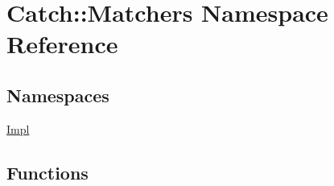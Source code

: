 \hypertarget{namespace_catch_1_1_matchers}{}\section{Catch\+:\+:Matchers Namespace Reference}
\label{namespace_catch_1_1_matchers}
\subsection*{Namespaces}
\begin{DoxyCompactItemize}
\item 
 \hyperlink{namespace_catch_1_1_matchers_1_1_impl}{Impl}
\end{DoxyCompactItemize}
\subsection*{Functions}
